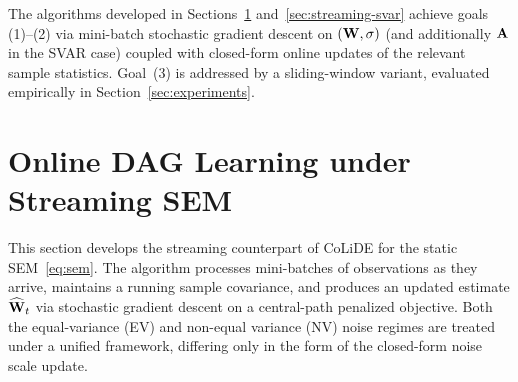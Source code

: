 \documentclass[journal,twoside]{IEEEtran}
\begin{document}




The algorithms developed in Sections~\ref{sec:streaming-sem}
and~\ref{sec:streaming-svar} achieve goals (1)--(2) via mini-batch
stochastic gradient descent on $({\mathbf W}, \sigma)$ (and additionally
${\mathbf A}$ in the SVAR case) coupled with closed-form online updates of
the relevant sample statistics. Goal~(3) is addressed by a sliding-window
variant, evaluated empirically in Section~\ref{sec:experiments}.


\section{Online DAG Learning under Streaming SEM}
\label{sec:streaming-sem}

This section develops the streaming counterpart of CoLiDE for the
static SEM~\eqref{eq:sem}. The algorithm processes mini-batches of
observations as they arrive, maintains a running sample covariance,
and produces an updated estimate $\widehat{{\mathbf W}}_t$ via stochastic
gradient descent on a central-path penalized objective. Both the
equal-variance (EV) and non-equal variance (NV) noise regimes are
treated under a unified framework, differing only in the form of the
closed-form noise scale update.
\end{document}
